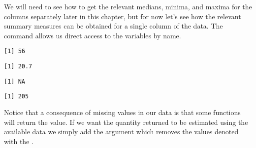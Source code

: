 We will need to see how to get the relevant medians, minima, and maxima for the columns separately later in this chapter, but for now let's see how the relevant summary measures can be obtained for a single column of the  data. The  command allows us direct access to the variables by name. 
\begin{knitrout}
\color{fgcolor}\begin{kframe}
\begin{alltt}
\hlstd{> }
\end{alltt}
\end{kframe}
\end{knitrout}
\begin{knitrout}
\color{fgcolor}\begin{kframe}
\begin{alltt}
\hlstd{> }
\end{alltt}
\begin{verbatim}
[1] 56
\end{verbatim}
\begin{alltt}
\hlstd{> }
\end{alltt}
\begin{verbatim}
[1] 20.7
\end{verbatim}
\begin{alltt}
\hlstd{> }
\end{alltt}
\begin{verbatim}
[1] NA
\end{verbatim}
\begin{alltt}
\hlstd{> } \hlstd{=}\hlstd{)}
\end{alltt}
\begin{verbatim}
[1] 205
\end{verbatim}
\end{kframe}
\end{knitrout}
Notice that a consequence of missing values in our data is that some functions will return the  value. If we want the quantity returned to be estimated using the available data we simply add the argument  which removes the values denoted with the . 
 
